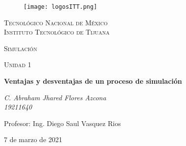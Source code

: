 \documentclass[letterpaper, 12pt]{article}
\begin{document}
    
    \begin{titlepage}
        \begin{figure}[ht]
            \centering
            \texttt{[image: logosITT.png]}
        \end{figure}
        \centering
        {\scshape\LARGE Tecnológico Nacional de México\\Instituto Tecnológico de Tijuana\par}
        \vspace{1cm}
        {\scshape\Large Simulación\par}
        \vspace{1cm}
        {\scshape\Large Unidad 1\par}
        \vspace{1.5cm}
        {\huge\bfseries Ventajas y desventajas de un proceso de simulación\par}
        \vspace{2cm}
        {\Large\itshape C. Abraham Jhared Flores Azcona\\19211640\par}
        \vfill
        Profesor: Ing. Diego Saul Vasquez Rios\par
    
        \vfill

        {\large 7 de marzo de 2021}
    \end{titlepage}
\end{document}

